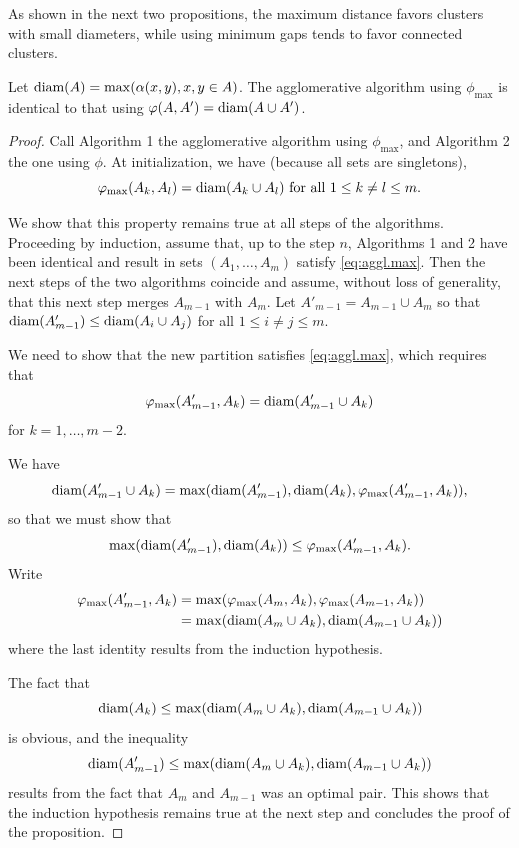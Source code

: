As shown in the next two propositions, the maximum distance favors clusters with small diameters, while 
using minimum gaps tends to favor connected clusters.
\begin{proposition}
\label{prop:aggl.max}
Let ${\mbox{\rm diam}}(A) = \max(\alpha(x,y), x,y\in A)$.
The agglomerative algorithm using $\phi_{\max}$ is identical to that using $\varphi(A,A') = {\mbox{\rm diam}}(A\cup A')$.
\end{proposition}
\begin{proof}
Call Algorithm 1 the agglomerative algorithm using $\phi_{\max}$, and Algorithm 2 the one using $\phi$. 
At initialization, we have (because all sets are singletons), 
\begin{equation}
\label{eq:aggl.max}
\varphi_{\max}(A_k, A_l) = {\mbox{\rm diam}}(A_k\cup A_l) \text{ for all }1 \leq k\neq l \leq m. 
\end{equation}

 We show that this property remains true at all steps of the algorithms. Proceeding by induction, assume that, up to the step $n$, Algorithms 1 and 2 have been identical and result in sets $(A_1, \ldots, A_m)$ satisfy \cref{eq:aggl.max}. Then the next steps of the two algorithms coincide and 
 assume, without loss of generality, that this next step merges $A_{m-1}$ with $A_m$.
 Let $A'_{m-1} = A_{m-1} \cup A_m$ so that 
${\mbox{\rm diam}}(A'_{m-1}) \leq {\mbox{\rm diam}}(A_i\cup A_j)$ for all $1\leq i\neq j\leq m$. 

We need to show that the new partition satisfies \cref{eq:aggl.max}, which requires that 
\[
\varphi_{\max}(A'_{m-1}, A_k) = {\mbox{\rm diam}}(A'_{m-1} \cup A_k)\]
 for $k=1, \ldots, m-2$. 

 We have 
\[
{\mbox{\rm diam}}(A'_{m-1}\cup A_k) = \max({\mbox{\rm diam}}(A'_{m-1}), {\mbox{\rm diam}}(A_k), \varphi_{\max}(A'_{m-1}, A_k)),
\]
so that we must show that 
\[
\max({\mbox{\rm diam}}(A'_{m-1}), {\mbox{\rm diam}}(A_k)) \leq \varphi_{\max}(A'_{m-1}, A_k).
\] 
 Write
\begin{align*}
\varphi_{\max}(A'_{m-1}, A_k) &= \max(\varphi_{\max}(A_m, A_k), \varphi_{\max}(A_{m-1}, A_k)) \\
& = \max({\mbox{\rm diam}}(A_m\cup A_k), {\mbox{\rm diam}}(A_{m-1}\cup A_k))
\end{align*}
where the last identity results from the induction hypothesis. 

 The fact that 
\[
{\mbox{\rm diam}}(A_k) \leq \max({\mbox{\rm diam}}(A_m\cup A_k), {\mbox{\rm diam}}(A_{m-1}\cup A_k))
\]
is obvious, and the inequality 
\[
{\mbox{\rm diam}}(A'_{m-1}) \leq \max({\mbox{\rm diam}}(A_m\cup A_k), {\mbox{\rm diam}}(A_{m-1}\cup A_k))
\]
results from the fact that $A_m$ and $A_{m-1}$ was an optimal  pair. This shows that the induction hypothesis remains true at the next step and concludes the proof of the proposition.
\end{proof}

